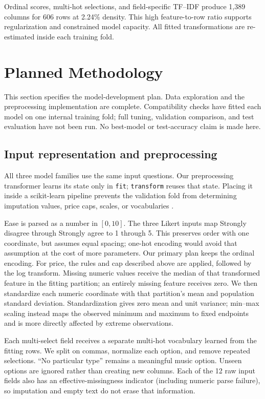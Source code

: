 \documentclass[12pt]{article}
\begin{document}
Ordinal scores, multi-hot selections, and field-specific TF--IDF produce 1,389
columns for 606 rows at 2.24\% density. This high feature-to-row ratio supports
regularization and constrained model capacity. All fitted transformations are
re-estimated inside each training fold.

\clearpage
\section{Planned Methodology}
This section specifies the model-development plan. Data exploration and the
preprocessing implementation are complete. Compatibility checks have fitted each
model on one internal training fold; full tuning, validation comparison, and test
evaluation have not been run. No best-model or test-accuracy claim is made here.

\subsection*{Input representation and preprocessing}
All three model families use the same input questions. Our preprocessing
transformer learns its state only in \texttt{fit};
\texttt{transform} reuses that state. Placing it inside a scikit-learn pipeline
prevents the validation fold from determining imputation values, price caps,
scales, or vocabularies \cite{sklearnpitfalls}.

Ease is parsed as a number in $[0,10]$. The three Likert inputs map Strongly
disagree through Strongly agree to 1 through 5. This preserves order with one
coordinate, but assumes equal spacing; one-hot encoding would avoid that
assumption at the cost of more parameters. Our primary plan keeps the ordinal
encoding. For price, the rules and cap described above are applied, followed by
the log transform. Missing numeric values receive the median of that transformed
feature in the fitting partition; an entirely missing feature receives zero.
We then standardize each numeric coordinate with that partition's mean and
population standard deviation. Standardization gives zero mean and unit variance;
min--max scaling instead maps the observed minimum and maximum to fixed endpoints
and is more directly affected by extreme observations.

Each multi-select field receives a separate multi-hot vocabulary learned from
the fitting rows. We split on commas, normalize each option, and remove repeated
selections. ``No particular type'' remains a meaningful music option. Unseen
options are ignored rather than creating new columns. Each of the 12 raw input
fields also has an effective-missingness indicator (including numeric parse
failure), so imputation and empty text do not erase that information.
\end{document}
